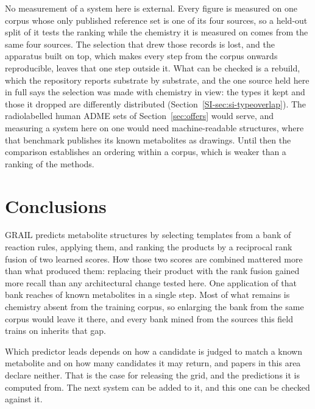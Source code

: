 No measurement of a system here is external. Every figure is measured on one corpus whose only
published reference set is one of its four sources, so a held-out split of it tests the ranking while the
chemistry it is measured on comes from the same four sources. The selection that drew those
records is lost, and the apparatus built on top, which makes every step from the corpus onwards
reproducible, leaves that one step outside it. What can be checked is a rebuild, which the repository reports substrate by substrate, and the
one source held here in full says the selection was made with chemistry in view: the types it kept and
those it dropped are differently distributed (Section~\ref{SI-sec:si-typeoverlap}). The radiolabelled human ADME sets of Section~\ref{sec:offers}
would serve, and measuring a system here on one would need machine-readable structures, where
that benchmark publishes its known metabolites as drawings. Until then the comparison establishes an
ordering within a corpus, which is weaker than a ranking of the methods.

\section{Conclusions}
\label{sec:conclusions}

GRAIL predicts metabolite structures by selecting templates from a bank of reaction rules, applying
them, and ranking the products by a reciprocal rank fusion of two learned scores. How those two
scores are combined mattered more than what produced them: replacing their product with the rank
fusion gained more recall than any architectural change tested here. One application of that bank
reaches \numCeilingCoverage{} of known metabolites in a single step. Most of what remains is
chemistry absent from the training corpus, so enlarging the bank from the same corpus would leave
it there, and every bank mined from the sources this field trains on inherits that gap.

Which predictor leads depends on how a candidate is judged to match a known metabolite and on how
many candidates it may return, and papers in this area declare neither. That is the case for
releasing the grid, and the predictions it is computed from. The next system can be added to it,
and this one can be checked against it.

